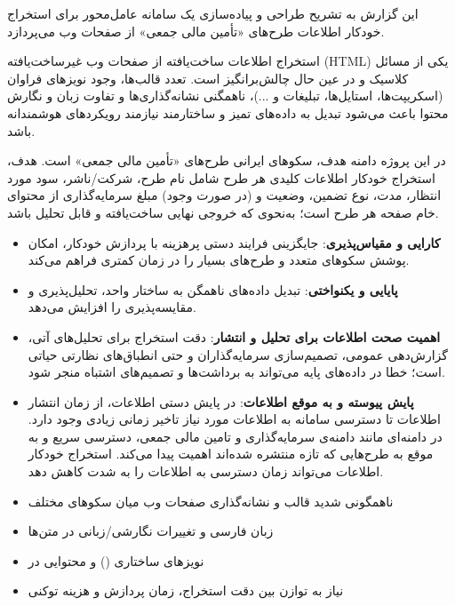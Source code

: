

این گزارش به تشریح طراحی و پیاده‌سازی یک سامانه عامل‌محور برای استخراج خودکار اطلاعات طرح‌های «تأمین مالی جمعی» از صفحات وب می‌پردازد.




استخراج اطلاعات ساخت‌یافته از صفحات وب غیرساخت‌یافته (HTML) یکی از مسائل کلاسیک و در عین حال چالش‌برانگیز است. تعدد قالب‌ها، وجود نویزهای فراوان (اسکریپت‌ها، استایل‌ها، تبلیغات و ...)، ناهمگنی نشانه‌گذاری‌ها و تفاوت زبان و نگارش محتوا باعث می‌شود تبدیل  به داده‌های تمیز و ساختارمند نیازمند رویکردهای هوشمندانه باشد.


در این پروژه دامنه هدف، سکو‌های ایرانی طرح‌های «تأمین مالی جمعی» است. هدف، استخراج خودکار اطلاعات کلیدی هر طرح شامل نام طرح، شرکت/ناشر، سود مورد انتظار، مدت، نوع تضمین، وضعیت و (در صورت وجود) مبلغ سرمایه‌گذاری از محتوای  خام صفحه هر طرح است؛ به‌نحوی که خروجی نهایی ساخت‌یافته و قابل تحلیل باشد.


\begin{itemize}
\item  \textbf{کارایی و مقیاس‌پذیری}: جایگزینی فرایند دستی پرهزینه با پردازش خودکار، امکان پوشش سکو‌های متعدد و طرح‌های بسیار را در زمان کمتری فراهم می‌کند.

\item  \textbf{پایایی و یکنواختی}: تبدیل داده‌های ناهمگن به ساختار واحد، تحلیل‌پذیری و مقایسه‌پذیری را افزایش می‌دهد.

\item  \textbf{اهمیت صحت اطلاعات برای تحلیل و انتشار}: دقت استخراج برای تحلیل‌های آتی، گزارش‌دهی عمومی، تصمیم‌سازی سرمایه‌گذاران و حتی انطباق‌های نظارتی حیاتی است؛ خطا در داده‌های پایه می‌تواند به برداشت‌ها و تصمیم‌های اشتباه منجر شود.

\item \textbf{پایش پیوسته و به موقع اطلاعات}: در پایش دستی اطلاعات، از زمان انتشار اطلاعات تا دسترسی سامانه به اطلاعات مورد نیاز تاخیر زمانی زیادی وجود دارد. در دامنه‌ای مانند دامنه‌ی سرمایه‌گذاری و تامین مالی جمعی، دسترسی سریع و به موقع به طرح‌هایی که تازه منتشره شده‌اند اهمیت پیدا می‌کند. استخراج خودکار اطلاعات می‌تواند زمان دسترسی به اطلاعات را به شدت کاهش دهد.
\end{itemize}


\begin{itemize}
\item ناهمگونی شدید قالب و نشانه‌گذاری صفحات وب میان سکو‌های مختلف
\item زبان فارسی و تغییرات نگارشی/زبانی در متن‌ها
\item نویزهای ساختاری () و محتوایی در 
\item نیاز به توازن بین دقت استخراج، زمان پردازش و هزینه توکنی
\end{itemize}


